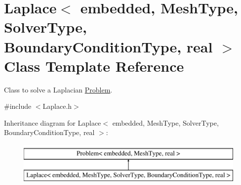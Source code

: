 \hypertarget{class_laplace}{}\section{Laplace$<$ embedded, Mesh\+Type, Solver\+Type, Boundary\+Condition\+Type, real $>$ Class Template Reference}
\label{class_laplace}


Class to solve a Laplacian \hyperlink{class_problem}{Problem}.  




{\ttfamily \#include $<$Laplace.\+h$>$}

Inheritance diagram for Laplace$<$ embedded, Mesh\+Type, Solver\+Type, Boundary\+Condition\+Type, real $>$\+:\begin{figure}[H]
\begin{center}
\leavevmode
\includegraphics[height=2.000000cm]{class_laplace}
\end{center}
\end{figure}
